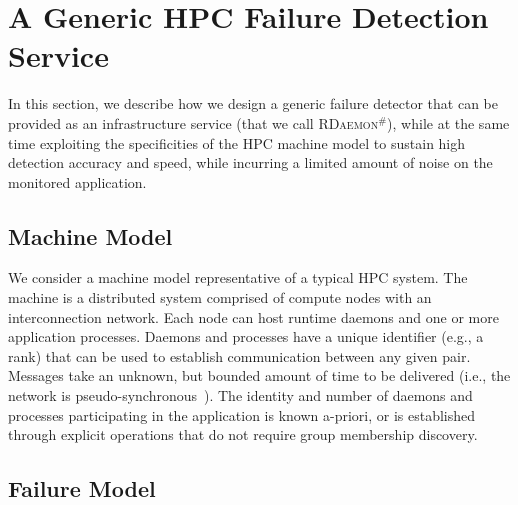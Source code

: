 \documentclass[sigconf]{acmart}
\newcommand{\ourwork}[0]{\textsc{RDaemon}\ensuremath{^\#}\xspace}
\begin{document}

\section{A Generic HPC Failure Detection Service}\label{sec:design}

In this section, we describe how we design a generic failure detector that can
be provided
as an infrastructure service (that we call \ourwork), while at the same time exploiting the
specificities of the HPC machine model to sustain high detection accuracy
and speed, while incurring a limited amount of noise on the monitored application.

\subsection{Machine Model}

We consider a machine model representative of a typical HPC system.
The machine is a distributed system comprised of compute nodes with an
interconnection network. Each
node can host runtime daemons and one or more application processes. Daemons
and processes have a unique identifier (e.g., a rank) that can be used
to establish communication between any given pair. Messages take an unknown,
but bounded amount of time to be delivered (i.e., the network is pseudo-synchronous~\cite{Chandra96}).
 The identity and number of daemons and processes participating in the application is known a-priori,
or is established through explicit operations that do not require group
membership discovery.

\subsection{Failure Model}
\end{document}

